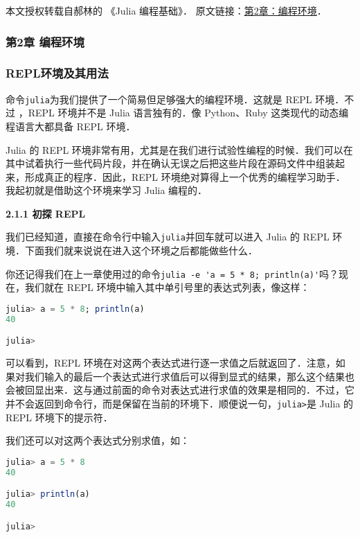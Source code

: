 
本文授权转载自郝林的 《Julia 编程基础》． 原文链接：\href{https://github.com/hyper0x/JuliaBasics/blob/master/book/ch02.md}{第2章：编程环境}．


\subsubsection{第2章  编程环境}

\subsubsection{REPL环境及其用法}

命令\verb|julia|为我们提供了一个简易但足够强大的编程环境．这就是 REPL 环境．不过
，REPL 环境并不是 Julia 语言独有的．像 Python、Ruby 这类现代的动态编程语言大都具备 REPL 环境．

Julia 的 REPL 环境非常有用，尤其是在我们进行试验性编程的时候．我们可以在其中试着执行一些代码片段，并在确认无误之后把这些片段在源码文件中组装起来，形成真正的程序．因此，REPL 环境绝对算得上一个优秀的编程学习助手．我起初就是借助这个环境来学习 Julia 编程的．

\textbf{2.1.1 初探 REPL}

我们已经知道，直接在命令行中输入\verb|julia|并回车就可以进入 Julia 的 REPL 环境．下面我们就来说说在进入这个环境之后都能做些什么．

你还记得我们在上一章使用过的命令\verb|julia -e 'a = 5 * 8; println(a)'|吗？现在，我们就在 REPL 环境中输入其中单引号里的表达式列表，像这样：

\begin{lstlisting}[language=julia]
julia> a = 5 * 8; println(a)
40

julia>
\end{lstlisting}

可以看到，REPL 环境在对这两个表达式进行逐一求值之后就返回了．注意，如果对我们输入的最后一个表达式进行求值后可以得到显式的结果，那么这个结果也会被回显出来．这与通过前面的命令对表达式进行求值的效果是相同的．不过，它并不会返回到命令行，而是保留在当前的环境下．顺便说一句，\verb|julia>|是 Julia 的 REPL 环境下的提示符．

我们还可以对这两个表达式分别求值，如：

\begin{lstlisting}[language=julia]
julia> a = 5 * 8
40

julia> println(a)
40

julia> 
\end{lstlisting}

